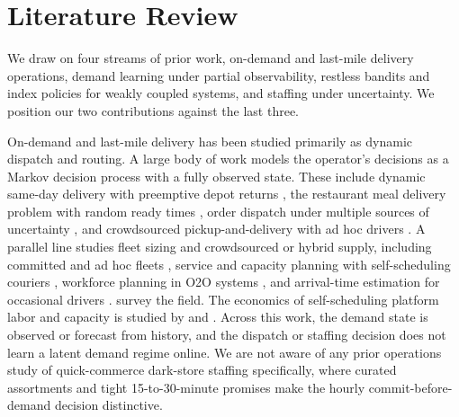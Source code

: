 \documentclass[preprint,11pt,authoryear]{elsarticle}
\theoremstyle{remark}
\begin{document}
\section{Literature Review}
\label{sec:literature}


We draw on four streams of prior work, on-demand and last-mile delivery operations, demand learning under partial observability, restless bandits and index policies for weakly coupled systems, and staffing under uncertainty. We position our two contributions against the last three.

On-demand and last-mile delivery has been studied primarily as dynamic dispatch and routing. A large body of work models the operator's decisions as a Markov decision process with a fully observed state. These include dynamic same-day delivery with preemptive depot returns \citep{UlmerThomasMattfeld2019}, the restaurant meal delivery problem with random ready times \citep{UlmerThomasCampbellWoyak2021}, order dispatch under multiple sources of uncertainty \citep{LIANG2026100240}, and crowdsourced pickup-and-delivery with ad hoc drivers \citep{ArslanAgatzKroonZuidwijk2019}. A parallel line studies fleet sizing and crowdsourced or hybrid supply, including committed and ad hoc fleets \citep{BehrendtBehrendtWang2024}, service and capacity planning with self-scheduling couriers \citep{YildizSavelsbergh2019}, workforce planning in O2O systems \citep{DaiLiu2020}, and arrival-time estimation for occasional drivers \citep{ZehtabianLarsenWohlk2022}. \citet{SavelsberghUlmer2024} survey the field. The economics of self-scheduling platform labor and capacity is studied by \citet{CachonDanielsLobel2017} and \citet{Taylor2018}. Across this work, the demand state is observed or forecast from history, and the dispatch or staffing decision does not learn a latent demand regime online. We are not aware of any prior operations study of quick-commerce dark-store staffing specifically, where curated assortments and tight 15-to-30-minute promises make the hourly commit-before-demand decision distinctive.
\end{document}
